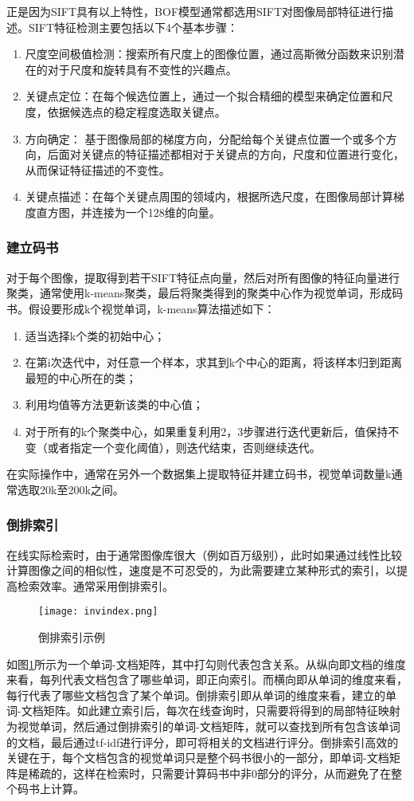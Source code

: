 正是因为SIFT具有以上特性，BOF模型通常都选用SIFT对图像局部特征进行描述。SIFT特征检测主要包括以下4个基本步骤：
\begin{enumerate}
\item 尺度空间极值检测：搜索所有尺度上的图像位置，通过高斯微分函数来识别潜在的对于尺度和旋转具有不变性的兴趣点。
\item 关键点定位：在每个候选位置上，通过一个拟合精细的模型来确定位置和尺度，依据候选点的稳定程度选取关键点。
\item 方向确定： 基于图像局部的梯度方向，分配给每个关键点位置一个或多个方向，后面对关键点的特征描述都相对于关键点的方向，尺度和位置进行变化，从而保证特征描述的不变性。
\item 关键点描述：在每个关键点周围的领域内，根据所选尺度，在图像局部计算梯度直方图，并连接为一个128维的向量。
\end{enumerate}

\subsubsection{建立码书}
对于每个图像，提取得到若干SIFT特征点向量，然后对所有图像的特征向量进行聚类，通常使用k-means聚类，最后将聚类得到的聚类中心作为视觉单词，形成码书。假设要形成k个视觉单词，k-means算法描述如下：
\begin{enumerate}
\item 适当选择k个类的初始中心；
\item 在第i次迭代中，对任意一个样本，求其到k个中心的距离，将该样本归到距离最短的中心所在的类；
\item 利用均值等方法更新该类的中心值；
\item 对于所有的k个聚类中心，如果重复利用2，3步骤进行迭代更新后，值保持不变（或者指定一个变化阈值），则迭代结束，否则继续迭代。
\end{enumerate}

在实际操作中，通常在另外一个数据集上提取特征并建立码书，视觉单词数量k通常选取20k至200k之间。

\subsubsection{倒排索引}
在线实际检索时，由于通常图像库很大（例如百万级别），此时如果通过线性比较计算图像之间的相似性，速度是不可忍受的，为此需要建立某种形式的索引，以提高检索效率。通常采用倒排索引。
\begin{figure}[h]
\centering
\texttt{[image: invindex.png]}
\caption{倒排索引示例}\label{fig:invindex}
\end{figure}
如图\ref{fig:invindex}所示为一个单词-文档矩阵，其中打勾则代表包含关系。从纵向即文档的维度来看，每列代表文档包含了哪些单词，即正向索引。而横向即从单词的维度来看，每行代表了哪些文档包含了某个单词。倒排索引即从单词的维度来看，建立的单词-文档矩阵。如此建立索引后，每次在线查询时，只需要将得到的局部特征映射为视觉单词，然后通过倒排索引的单词-文档矩阵，就可以查找到所有包含该单词的文档，最后通过tf-idf进行评分，即可将相关的文档进行评分。倒排索引高效的关键在于，每个文档包含的视觉单词只是整个码书很小的一部分，即单词-文档矩阵是稀疏的，这样在检索时，只需要计算码书中非0部分的评分，从而避免了在整个码书上计算。

